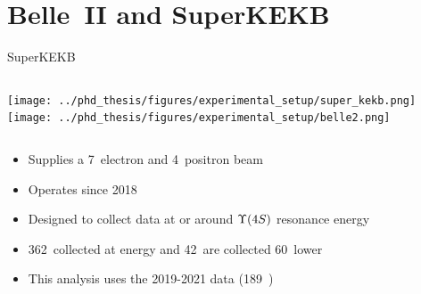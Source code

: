 \documentclass[xcolor=dvipsnames]{beamer}
\begin{document}

   \section{Belle~II and SuperKEKB}

   \begin{frame}{SuperKEKB}
      \scriptsize\centering
      \begin{columns}
         \texttt{[image: ../phd\_thesis/figures/experimental\_setup/super\_kekb.png]}
          \texttt{[image: ../phd\_thesis/figures/experimental\_setup/belle2.png]}
      \end{columns}

      \vspace{10pt}

      \begin{itemize}
         \item Supplies a 7~\gev electron and 4~\gev positron beam
         \item Operates since 2018
         \item Designed to collect data at or around $\FourS$ resonance energy
         \item 362~\invfb collected at \FourS energy and 42~\invfb are collected 60~\mev lower
         \item This analysis uses the 2019-2021 data (189~\invfb)
      \end{itemize}
   \end{frame}
\end{document}
